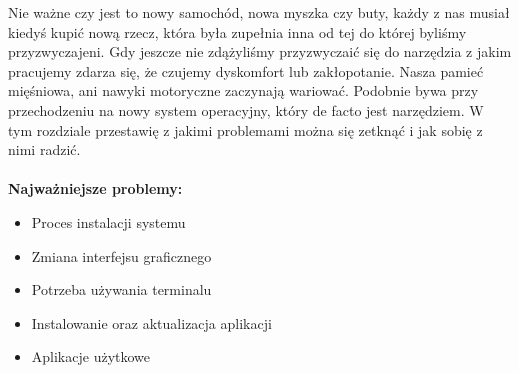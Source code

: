 \documentclass[10pt,a4paper]{report}
\begin{document}
Nie ważne czy jest to nowy samochód, nowa myszka czy buty, każdy z nas musiał kiedyś kupić nową rzecz, która była zupełnia inna od tej do której byliśmy przyzwyczajeni. Gdy jeszcze nie zdążyliśmy przyzwyczaić się do narzędzia z jakim pracujemy zdarza się, że czujemy dyskomfort lub zakłopotanie. Nasza pamieć mięśniowa, ani nawyki motoryczne zaczynają wariować. Podobnie bywa przy przechodzeniu na nowy system operacyjny, który de facto jest narzędziem. W tym rozdziale przestawię z jakimi problemami można się zetknąć i jak sobię z nimi radzić.\\\\
\textbf{Najważniejsze problemy:}
\begin{itemize}
\item Proces instalacji systemu
\item Zmiana interfejsu graficznego
\item Potrzeba używania terminalu
\item Instalowanie oraz aktualizacja aplikacji
\item Aplikacje użytkowe
\end{itemize}
\end{document}

